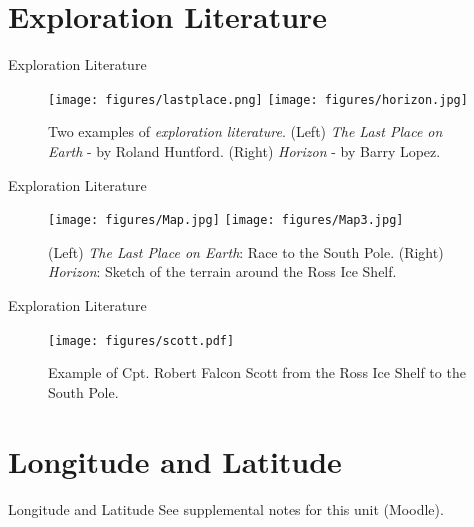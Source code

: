 \documentclass{beamer}
\begin{document}
\section{Exploration Literature}

\begin{frame}{Exploration Literature}
\begin{figure}
\centering
\texttt{[image: figures/lastplace.png]}
\texttt{[image: figures/horizon.jpg]}
\caption{Two examples of \textit{exploration literature}.  (Left) \textit{The Last Place on Earth} - by Roland Huntford. (Right) \textit{Horizon} - by Barry Lopez.}
\end{figure}
\end{frame}

\begin{frame}{Exploration Literature}
\begin{figure}
\centering
\texttt{[image: figures/Map.jpg]}
\texttt{[image: figures/Map3.jpg]}
\caption{(Left) \textit{The Last Place on Earth}: Race to the South Pole. (Right) \textit{Horizon}: Sketch of the terrain around the Ross Ice Shelf.}
\end{figure}
\end{frame}

\begin{frame}{Exploration Literature}
\begin{figure}
\centering
\texttt{[image: figures/scott.pdf]}
\caption{Example of Cpt. Robert Falcon Scott from the Ross Ice Shelf to the South Pole.}
\end{figure}
\end{frame}

\section{Longitude and Latitude}

\begin{frame}{Longitude and Latitude}
See supplemental notes for this unit (Moodle).
\end{frame}
\end{document}
